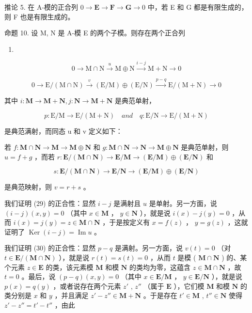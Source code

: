 推论 5. 在 A-模的正合列 \(0 \to \mathbf{E} \to \mathbf{F} \to \mathbf{G} \to 0\) 中，若 E 和 G 都是有限生成的，则 F 也是有限生成的。

命题 10. 设 M, N 是 A-模 E 的两个子模。则存在两个正合列

\begin{enumerate}
\def\labelenumi{(\arabic{enumi})}
\setcounter{enumi}{28}
\tightlist
\item
\end{enumerate}

\[
0 \longrightarrow \mathrm{M} \cap \mathrm{N} \stackrel {u} {\longrightarrow} \mathrm{M} \oplus \mathrm{N} \stackrel {i - j} {\longrightarrow} \mathrm{M} + \mathrm{N} \longrightarrow 0\tag{30}
\]

\[
0 \longrightarrow \mathrm{E} / (\mathrm{M} \cap \mathrm{N}) \stackrel {v} {\longrightarrow} (\mathrm{E} / \mathrm{M}) \oplus (\mathrm{E} / \mathrm{N}) \stackrel {p - q} {\longrightarrow} \mathrm{E} / (\mathrm{M} + \mathrm{N}) \longrightarrow 0
\]

其中 \(i:\mathbf{M}\to \mathbf{M} + \mathbf{N},j:\mathbf{N}\rightarrow \mathbf{M} + \mathbf{N}\) 是典范单射，

\[
p: \mathrm{E} / \mathrm{M} \rightarrow \mathrm{E} / (\mathrm{M} + \mathrm{N}) \quad and \quad q: \mathrm{E} / \mathrm{N} \rightarrow \mathrm{E} / (\mathrm{M} + \mathrm{N})
\]

是典范满射，而同态 u 和 v 定义如下：

若 \(f: \mathbf{M} \cap \mathbf{N} \to \mathbf{M} \to \mathbf{M} \oplus \mathbf{N}\) 和 \(g: \mathbf{M} \cap \mathbf{N} \to \mathbf{N} \to \mathbf{M} \oplus \mathbf{N}\) 是典范单射，则 \(u = f + g\) ，而若 \(r: \mathbf{E}/(\mathbf{M} \cap \mathbf{N}) \to \mathbf{E}/\mathbf{M} \to (\mathbf{E}/\mathbf{M}) \oplus (\mathbf{E}/\mathbf{N})\) 和

\[
s: \mathbf {E} / (\mathbf {M} \cap \mathbf {N}) \rightarrow \mathbf {E} / \mathbf {N} \rightarrow (\mathbf {E} / \mathbf {M}) \oplus (\mathbf {E} / \mathbf {N})
\]

是典范映射，则 \(v = r + s\) 。

我们证明 (29) 的正合性：显然 \(i-j\) 是满射且 \(u\) 是单射。另一方面，说 \((i-j)(x,y)=0\) （其中 \(x\in\mathbf{M}\) ， \(y\in\mathbf{N}\) ），就是说 \(i(x)-j(y)=0\) ，从而 \(i(x)=j(y)=z\in\mathbf{M}\cap\mathbf{N}\) ，于是按定义有 \(x=f(z)\) ， \(y=g(z)\) ，这就证明了 \(\operatorname{Ker}(i-j)=\operatorname{Im}u\) 。

我们证明 (30) 的正合性：显然 \(p - q\) 是满射。另一方面，说 \(v(t) = 0\) （对 \(t \in \mathbf{E} / (\mathbf{M} \cap \mathbf{N})\) ），就是说 \(r(t) = s(t) = 0\) ，从而 \(t\) 是模 ( \(\mathbf{M} \cap \mathbf{N}\) ) 的、某个元素 \(z \in \mathbf{E}\) 的类，该元素模 \(\mathbf{M}\) 和模 \(\mathbf{N}\) 的类均为零，这蕴含 \(z \in \mathbf{M} \cap \mathbf{N}\) ，故 \(t = 0\) 。最后，说 \((p - q)(x, y) = 0\) （其中 \(x \in \mathbf{E} / \mathbf{M}\) ， \(y \in \mathbf{E} / \mathbf{N}\) ），就是说 \(p(x) = q(y)\) ，或者说存在两个元素 \(z'\) , \(z''\) （属于 \(\mathbf{E}\) ），它们模 \(\mathbf{M}\) 和模 \(\mathbf{N}\) 的类分别是 \(x\) 和 \(y\) ，并且满足 \(z' - z'' \in \mathbf{M} + \mathbf{N}\) 。于是存在 \(t' \in \mathbf{M}\) , \(t'' \in \mathbf{N}\) 使得 \(z' - z'' = t' - t''\) ，由此


